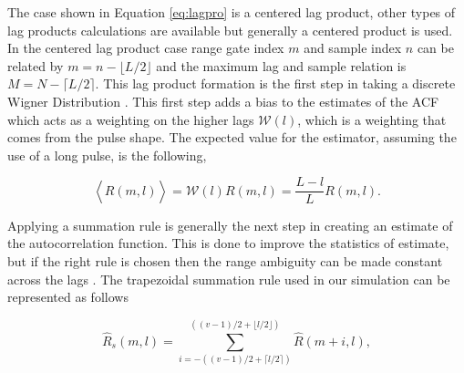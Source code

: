\documentclass[draft,ras]{agutex}
\begin{document}
\begin{article}
The case shown in Equation \ref{eq:lagpro} is a centered lag product, other types of lag products calculations are available but generally a centered product is used. In the centered lag product case range gate index $m$ and sample index $n$ can be related by $m=n-\lfloor L/2\rfloor$ and the maximum lag and sample relation is $M=N-\lceil L/2 \rceil$.  This lag product formation is the first step in taking a discrete Wigner Distribution \citep{TFAcohen}. This first step adds a bias to the estimates of the ACF which acts as a weighting on the higher lags $\mathcal{W}(l)$, which is a weighting that comes from the pulse shape. The expected value for the estimator, assuming the use of a long pulse, is the following,

\begin{equation}
\label{eq:lagprobias}
\left\langle\hat{R}(m,l) \right\rangle = \mathcal{W}(l)R(m,l) =\frac{L-l}{L}R(m,l).
\end{equation}
%
%

Applying a summation rule is generally the next step in creating an estimate of the autocorrelation function. This is done to improve the statistics of estimate, but if the right rule is chosen then the range ambiguity can be made constant across the lags \citep{nygren1996}. The trapezoidal summation rule used in our simulation can be represented as follows

\begin{equation}
\label{eq:sumrule}
\hat{R}_s(m,l) = \displaystyle\sum\limits_{i=-((v-1)/2+\lceil l/2 \rceil)}^{((v-1)/2+\lfloor l/2\rfloor)} \hat{R}(m+i,l),
\end{equation}


\end{article}
\end{document}
